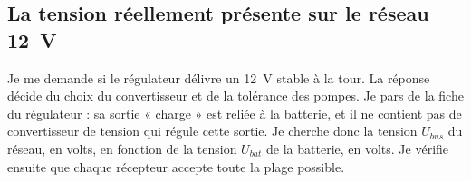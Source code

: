 
\subsection{La tension réellement présente sur le réseau \qty{12}{V}}

Je me demande si le régulateur délivre un \qty{12}{V} stable à la tour. La réponse décide du choix du convertisseur et de la tolérance des pompes. Je pars de la fiche du régulateur : sa sortie « charge » est reliée à la batterie, et il ne contient pas de convertisseur de tension qui régule cette sortie. Je cherche donc la tension $U_{bus}$ du réseau, en volts, en fonction de la tension $U_{bat}$ de la batterie, en volts. Je vérifie ensuite que chaque récepteur accepte toute la plage possible.

